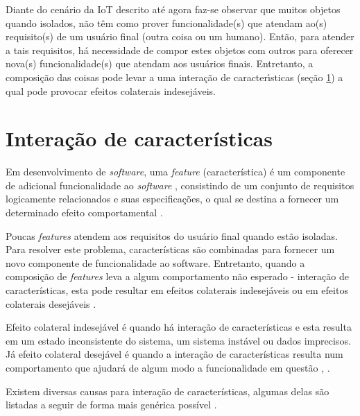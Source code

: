 Diante do cenário da IoT descrito até agora faz-se observar que muitos objetos quando isolados, não têm como prover funcionalidade(s) que atendam ao(s) requisito(s) de um usuário final (outra coisa ou um humano). Então, para atender a tais requisitos, há necessidade de compor estes objetos com outros para oferecer nova(s) funcionalidade(s) que atendam aos usuários finais. Entretanto, a composição das coisas pode levar a uma interação de caracterı́sticas (seção \ref{sec:featureinteraction}) a qual pode provocar efeitos colaterais indesejáveis.

\section{Interação de características}
\label{sec:featureinteraction}
Em desenvolvimento de \textit{software}, uma \textit{feature} (característica) é um componente de adicional funcionalidade ao \textit{software} \cite{Calder:2003}, consistindo de um conjunto de requisitos logicamente relacionados e suas especificações, o qual se destina a fornecer um determinado efeito comportamental \cite{NHLABATSI:2008}.

Poucas \textit{features} atendem aos requisitos do usuário final quando estão isoladas. Para resolver este problema, características são combinadas para fornecer um novo componente de funcionalidade ao software. Entretanto, quando a composição de \textit{features} leva a algum comportamento não esperado - interação de características, esta pode resultar em efeitos colaterais indesejáveis \cite{NHLABATSI:2008} ou em efeitos colaterais desejáveis \cite{Weiss:2005}.

Efeito colateral indesejável é quando há interação de características e esta resulta em um estado inconsistente do sistema, um sistema instável ou dados imprecisos. Já efeito colateral desejável é quando a interação de características resulta num comportamento que ajudará de algum modo a funcionalidade em questão \cite{Weiss:2005}, \cite{NHLABATSI:2008}.

Existem diversas causas para interação de características, algumas delas são listadas a seguir de forma mais genérica possível \cite{Weiss:2007}.

